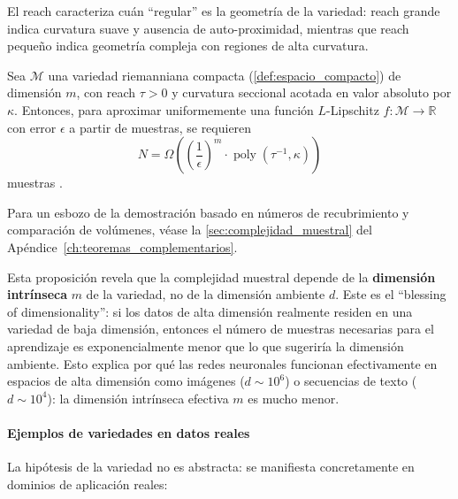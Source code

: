 El reach caracteriza cuán ``regular'' es la geometría de la variedad: reach grande indica curvatura suave y ausencia de auto-proximidad, mientras que reach pequeño indica geometría compleja con regiones de alta curvatura.

\begin{proposition}\label{prop:complejidad_muestral_variedades}
Sea $\mathcal{M}$ una variedad riemanniana compacta (\autoref{def:espacio_compacto}) de dimensión $m$, con reach $\tau > 0$ y curvatura seccional acotada en valor absoluto por $\kappa$. Entonces, para aproximar uniformemente una función $L$-Lipschitz $f: \mathcal{M} \to \mathbb{R}$ con error $\epsilon$ a partir de muestras, se requieren
\[
N = \Omega\left(\left(\frac{1}{\epsilon}\right)^m \cdot \operatorname{poly}(\tau^{-1}, \kappa)\right)
\]
muestras \citep{niyogi2008finding}.
\end{proposition}

Para un esbozo de la demostración basado en números de recubrimiento y comparación de volúmenes, véase la \autoref{sec:complejidad_muestral} del Apéndice~\ref{ch:teoremas_complementarios}.

Esta proposición revela que la complejidad muestral depende de la \textbf{dimensión intrínseca} $m$ de la variedad, no de la dimensión ambiente $d$. Este es el ``blessing of dimensionality'': si los datos de alta dimensión realmente residen en una variedad de baja dimensión, entonces el número de muestras necesarias para el aprendizaje es exponencialmente menor que lo que sugeriría la dimensión ambiente. Esto explica por qué las redes neuronales funcionan efectivamente en espacios de alta dimensión como imágenes ($d \sim 10^6$) o secuencias de texto ($d \sim 10^4$): la dimensión intrínseca efectiva $m$ es mucho menor.

\paragraph{Ejemplos de variedades en datos reales}

La hipótesis de la variedad no es abstracta: se manifiesta concretamente en dominios de aplicación reales:

